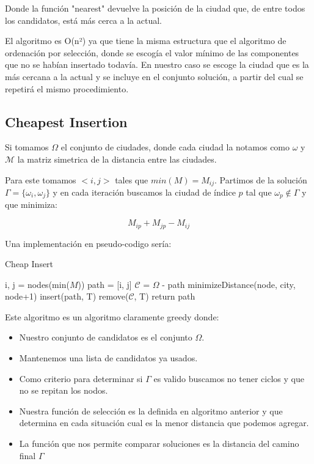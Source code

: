 \documentclass{article}
\begin{document}
Donde la función "nearest" devuelve la posición de la ciudad que, de entre 
todos los candidatos, está más cerca a la actual.

El algoritmo es O(n²) ya que tiene la misma estructura que el algoritmo de
ordenación por selección, donde se escogía el valor mínimo de las componentes 
que no se habían insertado todavía. En nuestro caso se escoge la ciudad que 
es la más cercana a la actual y se incluye en el conjunto solución, a partir 
del cual se repetirá el mismo procedimiento.

\subsection{Cheapest Insertion}

Si tomamos $\Omega$ el conjunto de ciudades, donde cada ciudad la
notamos como $\omega$ y $\mathcal{M}$ la matriz simetrica de la
distancia entre las ciudades.

Para este tomamos $<i,j>$ tales que $min(M) = M_{ij}$. Partimos de la
solución $\Gamma = \{ \omega_i, \omega_j \} $ y en cada iteración
buscamos la ciudad de índice $p$ tal que $\omega_p \notin \Gamma$ y que minimiza:

\[
  M_{ip} + M_{jp} - M_{ij}
\]

Una implementación en pseudo-codigo sería:

\begin{algorithm}[H]
\caption{Cheap Insert}
\begin{algorithmic}
\State i, j = nodes(min($M$))
\State path = [i, j]
\State $\mathcal{C}$ = $\Omega$ - path
\State minimizeDistance(node, city, node+1)
\EndFor
\State insert(path, T)
\State remove($\mathcal{C}$, T)
\EndIf
\EndFor
\EndWhile
\State return path
\end{algorithmic}
\end{algorithm}

Este algoritmo es un algoritmo claramente greedy donde:

\begin{itemize}
\item Nuestro conjunto de candidatos es el conjunto $\Omega$.
\item Mantenemos una lista de candidatos ya usados.
\item Como criterio para determinar si $\Gamma$ es valido buscamos no
  tener ciclos y que no se repitan los nodos.
\item Nuestra función de selección es la definida en algoritmo
  anterior y que determina en cada situación cual es la menor
  distancia que podemos agregar.
\item La función que nos permite comparar soluciones es la distancia
  del camino final $\Gamma$
\end{itemize}
\end{document}
